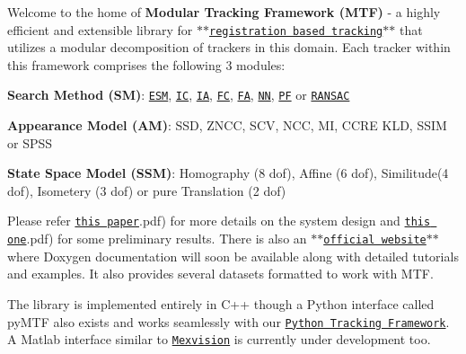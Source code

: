 Welcome to the home of {\bfseries Modular Tracking Framework (M\-T\-F)} -\/ a highly efficient and extensible library for \href{https://en.wikipedia.org/wiki/Kanade%E2%80%93Lucas%E2%80%93Tomasi_feature_tracker}{\tt $\ast$$\ast$registration based tracking$\ast$$\ast$} that utilizes a modular decomposition of trackers in this domain. Each tracker within this framework comprises the following 3 modules\-:


\begin{DoxyEnumerate}
\item {\bfseries Search Method (S\-M)}\-: \href{http://far.in.tum.de/pub/benhimane2007ijcv/benhimane2007ijcv.pdf}{\tt E\-S\-M}, \href{http://ieeexplore.ieee.org/xpl/login.jsp?tp=&arnumber=990652&url=http%3A%2F%2Fieeexplore.ieee.org%2Fiel5%2F7768%2F21353%2F00990652.pdf%3Farnumber%3D990652}{\tt I\-C}, \href{http://dl.acm.org/citation.cfm?id=290123}{\tt I\-A}, \href{http://link.springer.com/article/10.1023%2FA%3A1008195814169}{\tt F\-C}, \href{http://dl.acm.org/citation.cfm?id=1623280}{\tt F\-A}, \href{http://www.comp.nus.edu.sg/~haoyu/rss/rss09/p44.html}{\tt N\-N}, \href{http://cv.snu.ac.kr/jhkwon/PAMI14_tracking/index.htm}{\tt P\-F} or \href{http://ieeexplore.ieee.org/xpl/login.jsp?tp=&arnumber=7158323&url=http%3A%2F%2Fieeexplore.ieee.org%2Fiel7%2F7158225%2F7158304%2F07158323.pdf%3Farnumber%3D7158323}{\tt R\-A\-N\-S\-A\-C}
\item {\bfseries Appearance Model (A\-M)}\-: S\-S\-D, Z\-N\-C\-C, S\-C\-V, N\-C\-C, M\-I, C\-C\-R\-E K\-L\-D, S\-S\-I\-M or S\-P\-S\-S
\item {\bfseries State Space Model (S\-S\-M)}\-: Homography (8 dof), Affine (6 dof), Similitude(4 dof), Isometery (3 dof) or pure Translation (2 dof)
\end{DoxyEnumerate}

Please refer \href{http://webdocs.cs.ualberta.ca/~asingh1/docs/Modular%20Tracking%20Framework%20A%20Uni%EF%AC%81ed%20Approach%20to%20Registration%20based%20Tracking%20(CRV%202016}{\tt this paper}.pdf) for more details on the system design and \href{http://webdocs.cs.ualberta.ca/~asingh1/docs/Modular%20Decomposition%20and%20Analysis%20of%20Registration%20based%20Trackers%20(CRV%202016}{\tt this one}.pdf) for some preliminary results. There is also an \href{http://webdocs.cs.ualberta.ca/~vis/mtf/}{\tt $\ast$$\ast$official website$\ast$$\ast$} where Doxygen documentation will soon be available along with detailed tutorials and examples. It also provides several datasets formatted to work with M\-T\-F.

The library is implemented entirely in C++ though a Python interface called {\ttfamily py\-M\-T\-F} also exists and works seamlessly with our \href{https://bitbucket.org/abhineet123/ptf}{\tt Python Tracking Framework}. A Matlab interface similar to \href{http://ugweb.cs.ualberta.ca/~vis/courses/CompVis/lab/mexVision/}{\tt Mexvision} is currently under development too.

